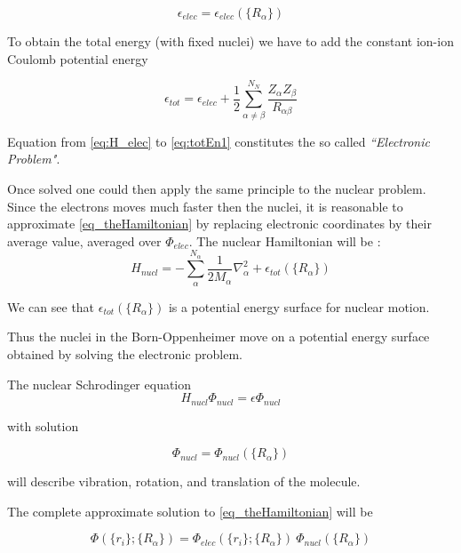 \documentclass[a4paper,12pt]{article}
\begin{document}
\begin{equation}
	\epsilon_{elec} = \epsilon_{elec}(\{R_{\alpha}\})
\end{equation}

To obtain the total energy (with fixed nuclei) we have to add the constant ion-ion Coulomb potential energy

\begin{equation}\label{eq:totEn1}
	\epsilon_{tot} = \epsilon_{elec} + \frac{1}{2} \sum_{\alpha \neq \beta}^{N_N} \frac{Z_{\alpha} Z_{\beta} }{R_{\alpha \beta}}
\end{equation}

Equation from \eqref{eq:H_elec} to \eqref{eq:totEn1} constitutes the so called \textit{``Electronic Problem"}.

Once solved one could then apply the same principle to the nuclear problem.
Since the electrons moves much faster then the nuclei, it is reasonable to approximate \eqref{eq_theHamiltonian} by replacing electronic coordinates by their average value, averaged over $\Phi_{elec}$.
The nuclear Hamiltonian will be :
\begin{equation}
	H_{nucl} = - \sum_{\alpha}^{N_{\alpha}} \frac{1}{2M_{\alpha}} \nabla_{\alpha}^2 + \epsilon_{tot}(\{ R_{\alpha}\})
\end{equation}

We can see that $\epsilon_{tot}(\{ R_{\alpha}\})$ is a potential energy surface for nuclear motion.

Thus the nuclei in the Born-Oppenheimer move on a potential energy surface obtained by solving the electronic problem.

The nuclear Schrodinger equation  
\begin{equation}
	H_{nucl} \Phi_{nucl} = \epsilon \Phi_{nucl} 
\end{equation}

with solution 

\begin{equation}
	\Phi_{nucl}=\Phi_{nucl}(\{R_{\alpha}\})
\end{equation}

will describe vibration, rotation, and translation of the molecule.

The complete approximate solution to \eqref{eq_theHamiltonian} will be  \cite[p.43-45]{Attila}

\begin{equation}
	\Phi(\{r_i\};\{R_{\alpha}\}) = \Phi_{elec}(\{r_i\};\{R_{\alpha}\})~\Phi_{nucl}(\{R_{\alpha}\})
\end{equation}
\end{document}
